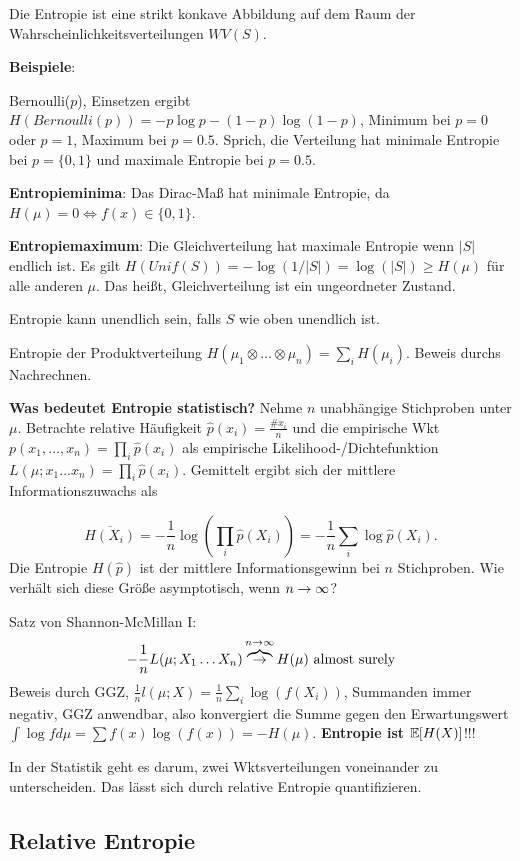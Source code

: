 \begin{outline}
    \1 Die Entropie ist eine strikt konkave Abbildung auf dem Raum der Wahrscheinlichkeitsverteilungen $WV(S)$.

\0 \textbf{Beispiele}: 

    \1 Bernoulli($p$), Einsetzen ergibt $H(Bernoulli(p))=-p \log p - (1-p)\log (1-p)$, Minimum bei $p=0$ oder $p=1$, Maximum bei $p=0.5$. Sprich, die Verteilung hat minimale Entropie bei $p=\{0,1\}$ und maximale Entropie bei $p=0.5$.

    \1 \textbf{Entropieminima}: Das Dirac-Maß hat minimale Entropie, da $H(\mu) = 0 \iff f(x)\in \{0,1\}$. 

    \1 \textbf{Entropiemaximum}: Die Gleichverteilung hat maximale Entropie wenn $|S|$ endlich ist. Es gilt $H(Unif(S)) = -\log(1/|S|)=\log(|S|)\geq H(\mu)$ für alle anderen $\mu$. Das heißt, Gleichverteilung ist ein ungeordneter Zustand. 

    \1 Entropie kann unendlich sein, falls $S$ wie oben unendlich ist. 

    \1 Entropie der Produktverteilung $H(\mu_1 \otimes \ldots \otimes \mu_n)=\sum_i H(\mu_i)$. Beweis durchs Nachrechnen.

\0 \textbf{Was bedeutet Entropie statistisch?} 
    \1 Nehme $n$ unabhängige Stichproben unter $\mu$. Betrachte relative Häufigkeit $\hat{p}(x_i)=\frac{\# x_i}{n}$ und die empirische Wkt $p(x_1,\ldots,x_n)=\prod_i \hat{p}(x_i)$ als empirische Likelihood-/Dichtefunktion $L(\mu;x_1\ldots x_n)=\prod_i \hat{p}(x_i)$. Gemittelt ergibt sich der mittlere Informationszuwachs als
    
$$\overline{H(X_i)}=-\frac{1}{n} \log(\prod_i \hat{p}(X_i))= - \frac{1}{n} \sum_i \log \hat{p}(X_i).$$
Die Entropie $H(\hat{p})$ ist der mittlere Informationsgewinn bei $n$ Stichproben. Wie verhält sich diese Größe asymptotisch, wenn $n\rightarrow\infty$?

    \1 Satz von Shannon-McMillan I:
    $$-\frac{1}{n}L(\mu;X_1\ldots X_n) \overbrace{\rightarrow}^{n\rightarrow\infty} H(\mu) \text{ almost surely}$$
    Beweis durch GGZ, $\frac{1}{n}l(\mu;X)=\frac{1}{n}\sum_i \log(f(X_i))$, Summanden immer negativ, GGZ anwendbar, also konvergiert die Summe gegen den Erwartungswert $\int \log f d\mu = \sum f(x)\log (f(x)) = -H(\mu)$. \textbf{Entropie ist $\mathbb{E}\hspace{-2pt}\left[{H(X)}\right]$}!!!

\0 In der Statistik geht es darum, zwei Wktsverteilungen voneinander zu unterscheiden. Das lässt sich durch relative Entropie quantifizieren. 
\end{outline}

\subsection{Relative Entropie}

